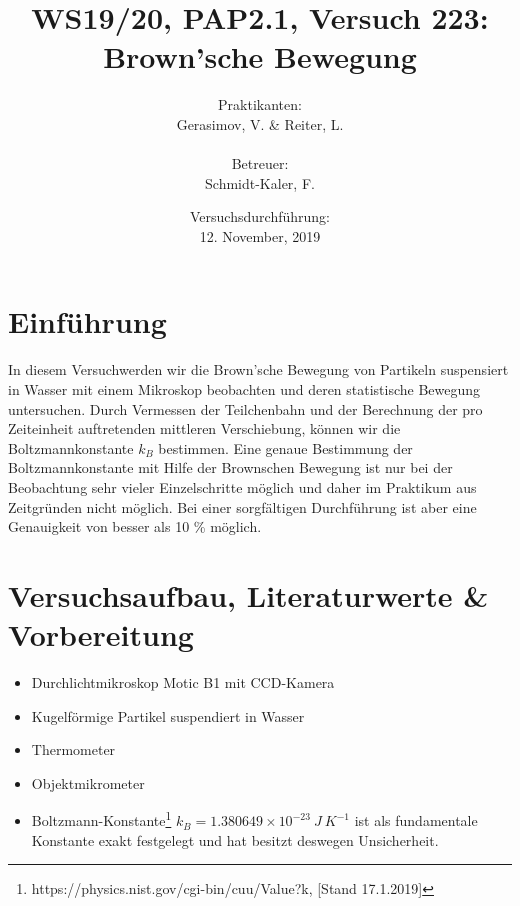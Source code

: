 \documentclass[a4paper,10pt]{article}
\title{WS19/20, PAP2.1, Versuch 223:\\Brown'sche Bewegung}
\date{Versuchsdurchführung: \\12. November, 2019}
\author{Praktikanten:\\Gerasimov, V. \& Reiter, L.\\\\ Betreuer:\\ Schmidt-Kaler, F.}
\begin{document}
\maketitle

\newpage

\tableofcontents



\section{Einführung}\boldmath
In diesem Versuch\fnrefb werden wir die Brown'sche Bewegung von Partikeln suspensiert in Wasser mit einem Mikroskop beobachten und deren statistische Bewegung untersuchen. Durch Vermessen der Teilchenbahn und der Berechnung der pro Zeiteinheit auftretenden mittleren Verschiebung, können
wir die Boltzmannkonstante \(k_B\) bestimmen. Eine genaue Bestimmung der Boltzmannkonstante mit Hilfe der Brownschen Bewegung ist nur bei der Beobachtung sehr vieler Einzelschritte möglich und daher im Praktikum aus Zeitgründen nicht möglich. Bei einer sorgfältigen
Durchführung ist aber eine Genauigkeit von besser als 10 \% möglich.
\section{Versuchsaufbau, Literaturwerte \& Vorbereitung}
\begin{itemize}
\item Durchlichtmikroskop Motic B1 mit CCD-Kamera
\item Kugelförmige Partikel suspendiert in Wasser
\item Thermometer
\item Objektmikrometer
\item Boltzmann-Konstante\footnote{https://physics.nist.gov/cgi-bin/cuu/Value?k, [Stand 17.1.2019]} \(k_B=1.380649\times 10^{-23}\:J\:K^{-1}\) ist als fundamentale Konstante exakt festgelegt und hat besitzt deswegen Unsicherheit.
\end{itemize}

\pagebreak
\end{document}
